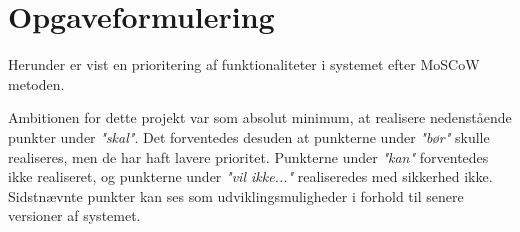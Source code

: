 \chapter{Opgaveformulering}
\label{ch:Opgaveformulering}

Herunder er vist en prioritering af funktionaliteter i systemet efter MoSCoW metoden. 

Ambitionen for dette projekt var som absolut minimum, at realisere nedenstående punkter under \textit{"skal"}. 
Det forventedes desuden at punkterne under \textit{"bør"} skulle realiseres, men de har haft lavere prioritet.
Punkterne under \textit{"kan"} forventedes ikke realiseret, og punkterne under \textit{"vil ikke..."} realiseredes med sikkerhed ikke. 
Sidstnævnte punkter kan ses som udviklingsmuligheder i forhold til senere versioner af systemet. 

